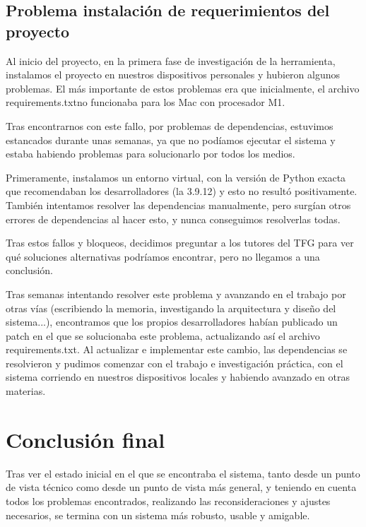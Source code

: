 \subsection{Problema instalación de requerimientos del proyecto}

Al inicio del proyecto, en la primera fase de investigación de la herramienta, instalamos el proyecto en nuestros dispositivos personales y hubieron algunos problemas. El más importante de estos problemas era que inicialmente, el archivo \textquotesingle requirements.txt\textquotesingle no funcionaba para los Mac con procesador M1.

Tras encontrarnos con este fallo, por problemas de dependencias, estuvimos estancados durante unas semanas, ya que no podíamos ejecutar el sistema y estaba habiendo problemas para solucionarlo por todos los medios.

Primeramente, instalamos un entorno virtual, con la versión de Python exacta que recomendaban los desarrolladores (la 3.9.12) y esto no resultó positivamente. También intentamos resolver las dependencias manualmente, pero surgían otros errores de dependencias al hacer esto, y nunca conseguimos resolverlas todas.

Tras estos fallos y bloqueos, decidimos preguntar a los tutores del TFG para ver qué soluciones alternativas podríamos encontrar, pero no llegamos a una conclusión. 

Tras semanas intentando resolver este problema y avanzando en el trabajo por otras vías (escribiendo la memoria, investigando la arquitectura y diseño del sistema...), encontramos que los propios desarrolladores habían publicado un patch en el que se solucionaba este problema, actualizando así el archivo requirements.txt. Al actualizar e implementar este cambio, las dependencias se resolvieron y pudimos comenzar con el trabajo e investigación práctica, con el sistema corriendo en nuestros dispositivos locales y habiendo avanzado en otras materias.

\section{Conclusión final}

Tras ver el estado inicial en el que se encontraba el sistema, tanto desde un punto de vista técnico como desde un punto de vista más general, y teniendo en cuenta todos los problemas encontrados, realizando las reconsideraciones y ajustes necesarios, se termina con un sistema más robusto, usable y amigable.

